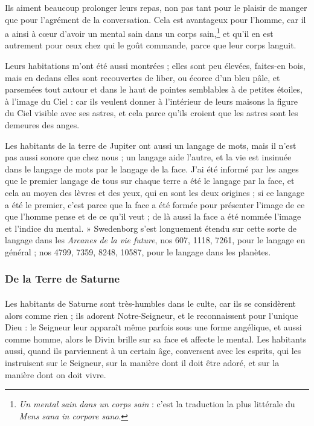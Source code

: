 \documentclass[a4paper, 11pt, oneside]{article}
\begin{document}
Ils aiment beaucoup prolonger leurs repas, non pas tant pour le plaisir de manger que pour l'agrément de la conversation. Cela est avantageux pour l'homme, car il a ainsi à cœur d'avoir un mental sain dans un corps sain,\footnote{\emph{Un mental sain dans un corps sain} : c'est la traduction la plus littérale du \emph{Mens sana in corpore sano}.} et qu'il en est autrement pour ceux chez qui le goût commande, parce que leur corps languit.

Leurs habitations m'ont été aussi montrées ; elles sont peu élevées, faites-en bois, mais en dedans elles sont recouvertes de liber, ou écorce d'un bleu pâle, et parsemées tout autour et dans le haut de pointes semblables à de petites étoiles, à l'image du Ciel : car ils veulent donner à l'intérieur de leurs maisons la figure du Ciel visible avec ses astres, et cela parce qu'ils croient que les astres sont les demeures des anges.

Les habitants de la terre de Jupiter ont aussi un langage de mots, mais il n'est pas aussi sonore que chez nous ; un langage aide l'autre, et la vie est insinuée dans le langage de mots par le langage de la face. J'ai été informé par les anges que le premier langage de tous sur chaque terre a été le langage par la face, et cela au moyen des lèvres et des yeux, qui en sont les deux origines ; si ce langage a été le premier, c'est parce que la face a été formée pour présenter l'image de ce que l'homme pense et de ce qu'il veut ; de là aussi la face a été nommée l'image et l'indice du mental. » Swedenborg s'est longuement étendu sur cette sorte de langage dans les \emph{Arcanes de la vie future}, nos 607, 1118, 7261, pour le langage en général ; nos 4799, 7359, 8248, 10587, pour le langage dans les planètes.

\subsubsection{De la Terre de Saturne}
\paragraph{}
Les habitants de Saturne sont très-humbles dans le culte, car ils se considèrent alors comme rien ; ils adorent Notre-Seigneur, et le reconnaissent pour l'unique Dieu : le Seigneur leur apparaît même parfois sous une forme angélique, et aussi comme homme, alors le Divin brille sur sa face et affecte le mental. Les habitants aussi, quand ils parviennent à un certain âge, conversent avec les esprits, qui les instruisent sur le Seigneur, sur la manière dont il doit être adoré, et sur la manière dont on doit vivre.
\end{document}
